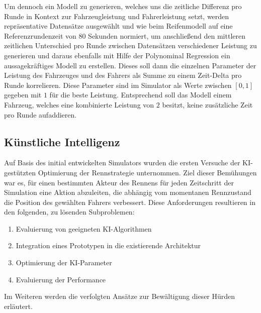 Um dennoch ein Modell zu generieren, welches uns die zeitliche Differenz pro Runde in Kontext zur Fahrzeugleistung und Fahrerleistung setzt, werden repräsentative Datensätze ausgewählt und wie beim Reifenmodell auf eine Referenzrundenzeit von 80 Sekunden normiert, um anschließend den mittleren zeitlichen Unterschied pro Runde zwischen Datensätzen verschiedener Leistung zu generieren und daraus ebenfalls mit Hilfe der Polynominal Regression ein aussagekräftiges Modell zu erstellen. Dieses soll dann die einzelnen Parameter der Leistung des Fahrzeuges und des Fahrers als Summe zu einem Zeit-Delta pro Runde korrelieren. Diese Parameter sind im Simulator als Werte zwischen $[0,1]$ gegeben mit $1$ für die beste Leistung. Entsprechend soll das Modell einem Fahrzeug, welches eine kombinierte Leistung von $2$ besitzt, keine zusätzliche Zeit pro Runde aufaddieren.


\subsection{Künstliche Intelligenz}
\label{künstliche_Intelligenz}
Auf Basis des initial entwickelten Simulators wurden die ersten Versuche der KI-gestützten Optimierung der Rennstrategie unternommen. Ziel dieser Bemühungen war es, für einen bestimmten Akteur des Rennens für jeden Zeitschritt der Simulation eine Aktion abzuleiten, die abhängig vom momentanen Rennzustand die Position des gewählten Fahrers verbessert. Diese Anforderungen resultieren in den folgenden, zu lösenden Subproblemen:
\begin{enumerate}
    \item Evaluierung von geeigneten KI-Algorithmen
    \item Integration eines Prototypen in die existierende Architektur
    \item Optimierung der KI-Parameter
    \item Evaluierung der Performance
\end{enumerate}
Im Weiteren werden die verfolgten Ansätze zur Bewältigung dieser Hürden erläutert.

